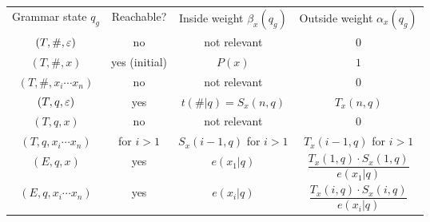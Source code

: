 \newcommand\mystrut{\rule[-0.6em]{0pt}{1.8em}}%
\newcommand\mylargestrut{\rule[-1.3em]{0pt}{3.2em}}%
\newcommand\mute{\color{black!30}}
\begin{center}\begin{tabular}{|c|c||c|c|}%
 \hline\mystrut
 Grammar state $q_g$ & Reachable? & Inside weight $\beta_x(q_g)$ & Outside weight $\alpha_x(q_g)$
 \\\hhline{|=|=#=|=|}\mystrut
 \mute$(T,\#,\varepsilon)$ & \mute no & \mute not relevant & \mute0
 \\\hline\mystrut
 $(T,\#,x)$ & yes (initial) & $P(x)$ & $1$
 \\\hline\mystrut
 \mute$(T,\#,x_i\cdots x_n)$ & \mute no & \mute not relevant & \mute0
 \\\hhline{|=|=#=|=|}\mystrut
 $(T,q,\varepsilon)$ & yes & $t(\#|q)=S_x(n,q)$ & $T_x(n,q)$
 \\\hline\mystrut
 \mute$(T,q,x)$ & \mute no & \mute not relevant & \mute0
 \\\hline\mystrut
 $(T,q,x_i\cdots x_n)$ & for $i>1$ & $S_x(i-1,q)$ for $i>1$ & $T_x(i-1,q)$ for $i>1$
 \\\hhline{|=|=#=|=|}\mylargestrut
 $(E,q,x)$ & yes & $e(x_1|q)$ & $\dfrac{T_x(1,q) \cdot S_x(1,q)}{e(x_1|q)}$
 \\\hline\mylargestrut
 $(E,q,x_i\cdots x_n)$ & yes & $e(x_i|q)$ & $\dfrac{T_x(i,q) \cdot S_x(i,q)}{e(x_i|q)}$
 \\\hline
\end{tabular}\end{center}
